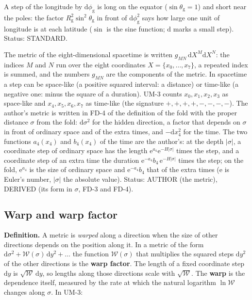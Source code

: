 \documentclass[
  10pt,
]{article}
\begin{document}
A step of the longitude by \(\mathrm{d}\phi_{\mathrm{g}}\) is long on
the equator (\(\sin\theta_{\mathrm{g}} = 1\)) and short near the poles:
the factor \(R_{\mathrm{g}}^2\sin^2\theta_{\mathrm{g}}\) in front of
\(\mathrm{d}\phi_{\mathrm{g}}^2\) says how large one unit of longitude
is at each latitude (\(\sin\) is the sine function; \(\mathrm{d}\) marks
a small step). Status: STANDARD.

The metric of the eight-dimensional spacetime is written
\(g_{MN}\,\mathrm{d}X^M\mathrm{d}X^N\): the indices \(M\) and \(N\) run
over the eight coordinates \(X = \{x_0, \dots, x_7\}\), a repeated index
is summed, and the numbers \(g_{MN}\) are the components of the metric.
In spacetime a step can be space-like (a positive squared interval: a
distance) or time-like (a negative one: minus the square of a duration).
UM-3 counts \(x_0, x_1, x_2, x_3\) as space-like and
\(x_4, x_5, x_6, x_7\) as time-like (the signature \(+,+,+,+,-,-,-,-\)).
The author's metric is written in FD-4 of the definition of the fold
with the proper distance \(\sigma\) from the fold:
\(\mathrm{d}\sigma^2\) for the hidden direction, a factor that depends
on \(\sigma\) in front of ordinary space and of the extra times, and
\(-\mathrm{d}x_4^2\) for the time. The two functions \(a_4(x_4)\) and
\(b_4(x_4)\) of the time are the author's: at the depth
\(\lvert\sigma\rvert\), a coordinate step of ordinary space has the
length \(\mathrm{e}^{a_4}\mathrm{e}^{-H\lvert\sigma\rvert}\) times the
step, and a coordinate step of an extra time the duration
\(\mathrm{e}^{-a_4}b_4\,\mathrm{e}^{-H\lvert\sigma\rvert}\) times the
step; on the fold, \(\mathrm{e}^{a_4}\) is the size of ordinary space
and \(\mathrm{e}^{-a_4}b_4\) that of the extra times (\(\mathrm{e}\) is
Euler's number, \(\lvert\sigma\rvert\) the absolute value). Status:
AUTHOR (the metric), DERIVED (its form in \(\sigma\), FD-3 and FD-4).

\hypertarget{warp-and-warp-factor}{%
\subsection{Warp and warp factor}\label{warp-and-warp-factor}}

\textbf{Definition.} A metric is \emph{warped} along a direction when
the size of other directions depends on the position along it. In a
metric of the form
\(\mathrm{d}\sigma^2 + \mathcal{W}(\sigma)\,\mathrm{d}y^2 + \dots\) the
function \(\mathcal{W}(\sigma)\) that multiplies the squared steps
\(\mathrm{d}y^2\) of the other directions is the \textbf{warp factor}.
The length of a fixed coordinate step \(\mathrm{d}y\) is
\(\sqrt{\mathcal{W}}\,\mathrm{d}y\), so lengths along those directions
scale with \(\sqrt{\mathcal{W}}\). The \textbf{warp} is the dependence
itself, measured by the rate at which the natural logarithm
\(\ln\mathcal{W}\) changes along \(\sigma\). In UM-3:
\end{document}
